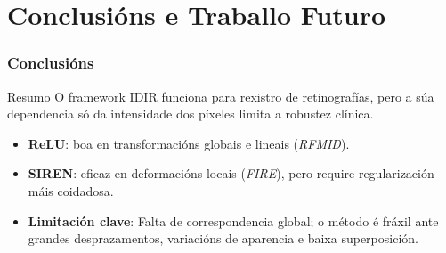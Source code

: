 \documentclass[xcolor=dvipsnames]{beamer}
\begin{document}
\section{Conclusións e Traballo Futuro}

\begin{frame}
    \frametitle{Conclusións}

    \begin{block}{Resumo}
        O framework IDIR funciona para rexistro de retinografías, pero a súa dependencia só da intensidade dos píxeles limita a robustez clínica.
    \end{block}

    \begin{itemize}
        \item \textbf{ReLU}: boa en transformacións globais e lineais (\textit{RFMID}).
        \item \textbf{SIREN}: eficaz en deformacións locais (\textit{FIRE}), pero require regularización máis coidadosa.
        \item \textbf{Limitación clave}: Falta de correspondencia global; o método é fráxil ante grandes desprazamentos, variacións de aparencia e baixa superposición.
    \end{itemize}

    \end{frame}
\end{document}
